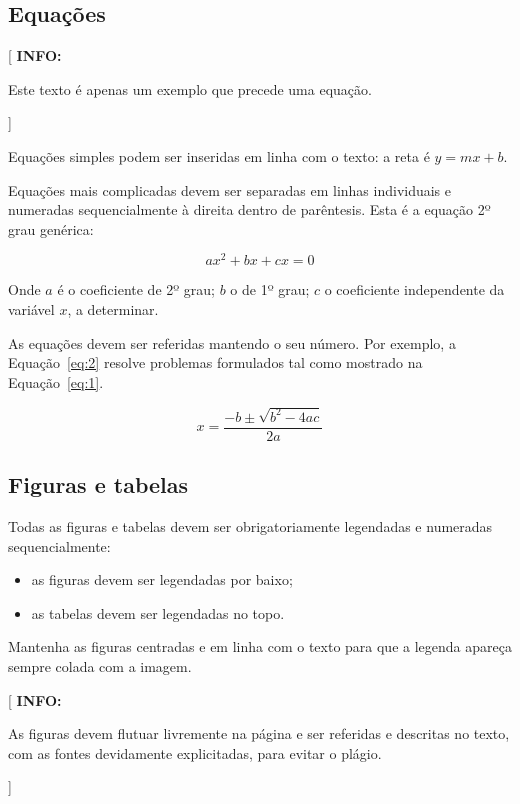 \documentclass[11pt,a4paper]{report}
\newenvironment{info}[1]{\vspace*{6mm}\color{blue}[ \textbf{INFO:} \begin{em} #1}
                        {\vspace*{3mm}\end{em} ]}
\begin{document}
\subsection*{Equações}

\begin{info}
Este texto é apenas um exemplo que precede uma equação.
\end{info}  

Equações simples podem ser inseridas em linha com o texto: 
a reta é \(y=mx+b\).

Equações mais complicadas devem ser separadas em linhas individuais e
numeradas sequencialmente à direita dentro de parêntesis.
Esta é a equação 2º grau genérica:

\begin{equation} \label{eq:1}
  ax^2+bx+cx=0
\end{equation}

Onde $a$ é o coeficiente de 2º grau; $b$ o de 1º grau; $c$ o
coeficiente independente da variável $x$, a determinar.

As equações devem ser referidas mantendo o seu número.
Por exemplo, a Equação~\ref{eq:2} resolve problemas formulados tal como 
mostrado na Equação~\ref{eq:1}.

\begin{equation} \label{eq:2}
  x=\frac{-b\pm \sqrt{b^2-4ac}}{2a}
\end{equation}

\subsection*{Figuras e tabelas}

Todas as figuras e tabelas devem ser obrigatoriamente legendadas e
numeradas sequencialmente:

\begin{itemize}
\item as figuras devem ser legendadas por baixo;
\item as tabelas devem ser legendadas no topo. 
\end{itemize}

Mantenha as figuras centradas e em linha com o texto para que a
legenda apareça sempre colada com a imagem.

\begin{info}
As figuras devem flutuar livremente na página e ser referidas e
descritas no texto, com as fontes devidamente explicitadas, para
evitar o plágio.
\end{info}
\end{document}
